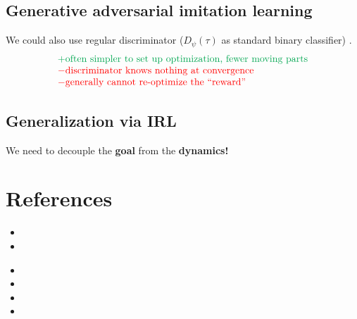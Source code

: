 \subsection{Generative adversarial imitation learning}
We could also use regular discriminator ($D_\psi(\tau)$ as standard binary classifier) \cite{ho2016generative}.
\[\begin{matrix*}[l]
	\color{Green}+ \text{often simpler to set up optimization, fewer moving parts}\\
	\color{red}- \text{discriminator knows nothing at convergence}\\
	\color{red}- \text{generally cannot re-optimize the “reward”}
\end{matrix*}\]

\subsection{Generalization via IRL}
We need to decouple the \textbf{goal} from the \textbf{dynamics!} \cite{fu2017learning}

\section{References}
\begin{itemize}
	\item {}
	\item {}
\end{itemize}

\begin{itemize}
	\item {}
	\item {}
	\item {}
	\item {}
\end{itemize}
